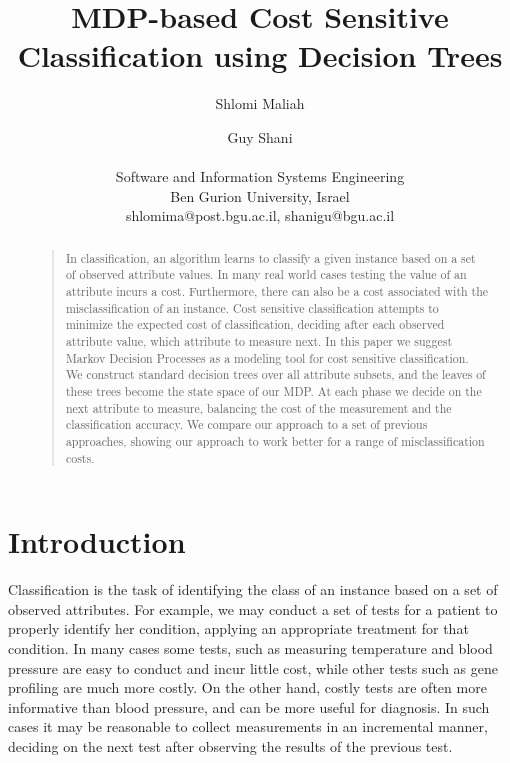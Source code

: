 \documentclass[letterpaper]{article}
\theoremstyle{definition}
\begin{document}
%
%
\title{MDP-based Cost Sensitive Classification using Decision Trees}

\author{Shlomi Maliah \and Guy Shani \\\\
Software and Information Systems Engineering\\
Ben Gurion University, Israel \\
shlomima@post.bgu.ac.il, shanigu@bgu.ac.il
}

\maketitle
\begin{abstract}
\begin{quote}
In classification, an algorithm learns to classify a given instance based on a set of observed attribute values. In many real world cases testing the value of an attribute incurs a cost. Furthermore, there can also be a cost associated with the misclassification of an instance. Cost sensitive classification attempts to minimize the expected cost of classification,  deciding after each observed attribute value, which attribute to measure next. In this paper we suggest Markov Decision Processes as a modeling tool for cost sensitive classification. We construct standard decision trees over all attribute subsets, and the leaves of these trees become the state space of our MDP. At each phase we decide on the next attribute to measure, balancing the cost of the measurement and the classification accuracy. We compare our approach to a set of previous approaches, showing our approach to work better for a range of misclassification costs.

\end{quote}
\end{abstract}


\section{Introduction}

Classification is the task of identifying the class of an instance based on a set of observed attributes. For example, we may conduct a set of tests for a patient to properly identify her condition, applying an appropriate treatment for that condition. In many cases some tests, such as measuring temperature and blood pressure are easy to conduct and incur little cost, while other tests such as gene profiling are much more costly. On the other hand, costly tests are often more informative than blood pressure, and can be more useful for diagnosis. In such cases it may be reasonable to collect measurements in an incremental manner, deciding on the next test after observing the results of the previous test.
\end{document}
